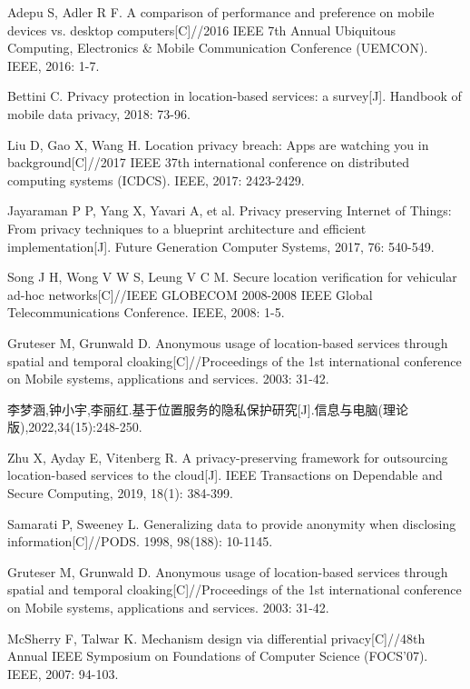 \documentclass[zihao=-4]{ctexart}
\begin{document}
\begin{thebibliography}{2}
	Adepu S, Adler R F. A comparison of performance and preference on mobile devices vs. desktop computers[C]//2016 IEEE 7th Annual Ubiquitous Computing, Electronics \& Mobile Communication Conference (UEMCON). IEEE, 2016: 1-7.
	
	Bettini C. Privacy protection in location-based services: a survey[J]. Handbook of mobile data privacy, 2018: 73-96.
	
	Liu D, Gao X, Wang H. Location privacy breach: Apps are watching you in background[C]//2017 IEEE 37th international conference on distributed computing systems (ICDCS). IEEE, 2017: 2423-2429.
	
	Jayaraman P P, Yang X, Yavari A, et al. Privacy preserving Internet of Things: From privacy techniques to a blueprint architecture and efficient implementation[J]. Future Generation Computer Systems, 2017, 76: 540-549.
	
	Song J H, Wong V W S, Leung V C M. Secure location verification for vehicular ad-hoc networks[C]//IEEE GLOBECOM 2008-2008 IEEE Global Telecommunications Conference. IEEE, 2008: 1-5.
	
	Gruteser M, Grunwald D. Anonymous usage of location-based services through spatial and temporal cloaking[C]//Proceedings of the 1st international conference on Mobile systems, applications and services. 2003: 31-42.
	
	李梦涵,钟小宇,李丽红.基于位置服务的隐私保护研究[J].信息与电脑(理论版),2022,34(15):248-250.
	
	Zhu X, Ayday E, Vitenberg R. A privacy-preserving framework for outsourcing location-based services to the cloud[J]. IEEE Transactions on Dependable and Secure Computing, 2019, 18(1): 384-399.
	
	Samarati P, Sweeney L. Generalizing data to provide anonymity when disclosing information[C]//PODS. 1998, 98(188): 10-1145.
	
	Gruteser M, Grunwald D. Anonymous usage of location-based services through spatial and temporal cloaking[C]//Proceedings of the 1st international conference on Mobile systems, applications and services. 2003: 31-42.
	
	McSherry F, Talwar K. Mechanism design via differential privacy[C]//48th Annual IEEE Symposium on Foundations of Computer Science (FOCS'07). IEEE, 2007: 94-103.
	

\end{thebibliography}
\end{document}
